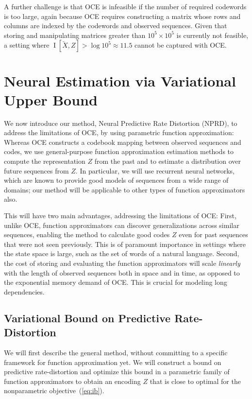 \documentclass[entropy,article,submit,moreauthors,pdftex,10pt,a4paper]{Definitions/mdpi}
\newcommand{\past}{\overleftarrow{X}}
\begin{document}
A further challenge is that OCE is infeasible if the number of required codewords is too large, again because OCE requires constructing a matrix whose rows and columns are indexed by the codewords and observed sequences.
Given that storing and manipulating matrices greater than $10^5 \times 10^5$ is currently not feasible, a setting where $\operatorname{I}[\past, Z] > \log 10^5 \approx 11.5$ cannot be captured with OCE.

\section{Neural Estimation via Variational Upper Bound}\label{sec:nprd}

We now introduce our method, Neural Predictive Rate Distortion (NPRD), to address the limitations of OCE, by using parametric function approximation:
Whereas OCE constructs a codebook mapping between observed sequences and codes, we use general-purpose function approximation estimation methods to compute the representation $Z$ from the past and to estimate a distribution over future sequences from $Z$.
In particular, we will use recurrent neural networks, which are known to provide good models of sequences from a wide range of domains; our method will be applicable to other types of function approximators also.

This will have two main advantages, addressing the limitations of OCE:
First, unlike OCE, function approximators can discover generalizations across similar sequences, enabling the method to calculate good codes $Z$ even for past sequences that were not seen previously.
This is of paramount importance in settings where the state space is large, such as the set of words of a natural language.
Second, the cost of storing and evaluating the function approximators will scale \emph{linearly} with the length of observed sequences both in space and in time, as opposed to the exponential memory demand of OCE.
This is crucial for modeling long dependencies.

\subsection{Variational Bound on Predictive Rate-Distortion}
We will first describe the general method, without committing to a specific framework for function approximation yet.
We will construct a bound on predictive rate-distortion and optimize this bound in a parametric family of function approximators to obtain an encoding $Z$ that is close to optimal for the nonparametric objective~(\ref{eq:ib}).
\end{document}
